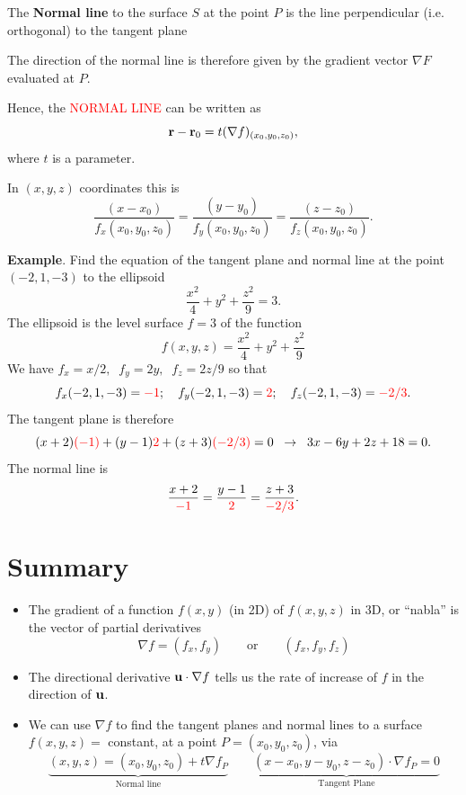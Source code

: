 \documentclass{article}
\begin{document}
The \textbf{Normal line} to the surface $S$ at the point $P$ is the line perpendicular
(i.e. orthogonal) to the tangent plane

The direction of the normal line is therefore given by the gradient
vector $\nabla F$ evaluated at $P$. 

Hence, the \textcolor{red}{NORMAL LINE} can be written as
$$
{\bf r}- {\bf r}_0 = t (\nabla f)_{(x_0,y_0,z_0)},
$$
where $t$ is a parameter. 

In $(x, y, z)$ coordinates this is
$$
\frac{(x-x_0)}{f_x{(x_0,y_0,z_0)}} =
\frac{(y-y_0)}{f_y{(x_0,y_0,z_0)}}=\frac{(z-z_0)}{f_z{(x_0,y_0,z_0)}}.
$$



\textbf{Example}. Find the equation of the tangent plane and
normal line at the point  $(-2,1,-3)$ to the ellipsoid
$$
\frac{x^2}{4}+ y^2+\frac{z^2}{9}=3.
$$
The ellipsoid is the level surface $f = 3$ of the function
$$
f (x,y,z) =\frac{x^2}{4}+ y^2+\frac{z^2}{9}
$$
We have $f_x=x/2, \;\; f_y=2y, \;\; f_z=2z/9$ so that
$$
f_x{(-2,1,-3)}=\textcolor{red}{-1}; \quad f_y{(-2,1,-3)}=\textcolor{red}{2}; \quad f_z{(-2,1,-3)}=\textcolor{red}{-2/3}.
$$
The tangent plane is therefore
$$
(x+2)\textcolor{red}{(-1)}+(y-1)\textcolor{red}{2}+ (z+3)\textcolor{red}{(-2/3)}=0\;\; \to \;\; 3x-6y+2z+18=0.
$$
The normal line is
$$
 \frac{x+2}{\textcolor{red}{-1}} = \frac{y-1}{\textcolor{red}{2}} =\frac{z+3}{\textcolor{red}{-2/3}}.
$$


\section{Summary}

\begin{itemize}
\item
The gradient of a function $f(x,y)$ (in 2D) of $f(x,y,z)$ in 3D, or ``nabla'' is the vector of partial derivatives
$$
\nabla f = (f_x, f_y) \qquad \mbox{or} \qquad (f_x, f_y, f_z)
$$
\item
The directional derivative ${\bf u} \cdot \nabla f$ tells us the rate of increase of $f$ in the direction of ${\bf u}$.
\item
We can use $\nabla f$ to find the tangent planes and normal lines to a surface $f(x,y,z) = $ constant, at a point $P = (x_0, y_0, z_0)$, via
$$
\underbrace{(x, y, z) = (x_0, y_0, z_0) + t \nabla f_P}_{\mbox{Normal line}} \qquad 
\underbrace{(x-x_0, y-y_0, z-z_0) \cdot \nabla f_P = 0}_{\mbox{Tangent Plane}}
$$
\end{itemize}
\end{document}
